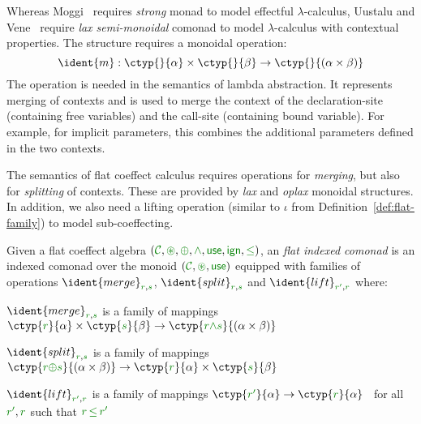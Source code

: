 Whereas Moggi~\cite{monad-notions} requires \emph{strong} monad to model effectful $\lambda$-calculus, 
Uustalu and Vene~\cite{comonads-notions} require \emph{lax semi-monoidal} comonad to model 
$\lambda$-calculus with contextual properties. The structure requires a monoidal operation:
%
\begin{equation*}
\ident{m} : \ctyp{}{\alpha} \times \ctyp{}{\beta} \rightarrow \ctyp{}{(\alpha \times \beta)}
\end{equation*}
%
The  operation is needed in the semantics of lambda abstraction. It represents merging of 
contexts and is used to merge the context of the declaration-site (containing free variables)
and the call-site (containing bound variable). For example, for implicit parameters, this combines
the additional parameters defined in the two contexts.

The semantics of flat coeffect calculus requires operations for \emph{merging}, but also for
\emph{splitting} of contexts. These are provided by \emph{lax} and \emph{oplax} monoidal 
structures. In addition, we also need a lifting operation (similar to $\iota$ from 
Definition~\ref{def:flat-family}) to model sub-coeffecting.

\begin{definition}
Given a flat coeffect algebra $(\C, \cseq, \cpar, \czip, \cunit, \czero, \cleq)$,
an \emph{flat indexed comonad} is an indexed comonad over the monoid $(\C, \cseq, \cunit)$
equipped with families of operations $\ident{merge}_{\cclrd{r},\cclrd{s}}$, $\ident{split}_{\cclrd{r},\cclrd{s}}$ 
and $\ident{lift}_{\cclrd{r'},\cclrd{r}}$ where:
%
\begin{compactitem}
\item $\ident{merge}_{\cclrd{r},\cclrd{s}}$ is a family of mappings
  $\ctyp{\cclrd{r}}{\alpha} \times \ctyp{\cclrd{s}}{\beta} \rightarrow \ctyp{\cclrd{r}\czip\cclrd{s}}{(\alpha \times \beta)}$
\item $\ident{split}_{\cclrd{r},\cclrd{s}}$ is a family of mappings
  $\ctyp{\cclrd{r}\cpar\cclrd{s}}{(\alpha \times \beta)} \rightarrow \ctyp{\cclrd{r}}{\alpha} \times \ctyp{\cclrd{s}}{\beta}$
\item $\ident{lift}_{\cclrd{r'},\cclrd{r}}$ is a family of mappings
  $\ctyp{\cclrd{r'}}{\alpha} \rightarrow \ctyp{\cclrd{r}}{\alpha}$~ for all $\cclrd{r'}, \cclrd{r}$ such that $\cclrd{r}\,\cleq\,\cclrd{r'}$
\end{compactitem}
%
%
%
%
\end{definition}

